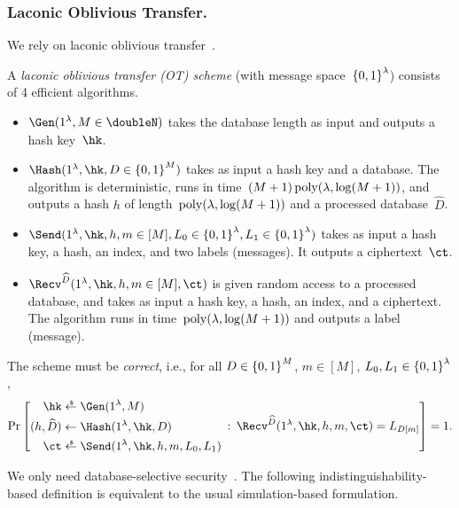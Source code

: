 \subsubsection{Laconic Oblivious Transfer.}
We rely on laconic oblivious transfer~\cite{C:CDGGMP17}.

\begin{definition}\label{def:lot}
A \emph{laconic oblivious transfer (OT) scheme} (with message space~${\{0,1\}}^\lambda$) consists of 4 efficient algorithms.
\begin{itemize}
\item $\Gen(1^\lambda,{M\in\doubleN})$ takes the database length as input and outputs a hash key~$\hk$.
\item $\Hash(1^\lambda,\hk,{D\in\bit^M})$ takes as input a hash key and a database.
The algorithm is deterministic,
runs in time~${(M+1)\operatorname{poly}(\lambda,\log(M+1))}$, and
outputs a hash $h$ of length~${\operatorname{poly}(\lambda,\log(M+1))}$ and a processed database~$\widehat{D}$.
\item $\Send(1^\lambda,\hk,h,{m\in[M]},{L_0\in\bit^\lambda},{L_1\in\bit^\lambda})$
takes as input a hash key, a hash, an index, and two labels (messages).
It outputs a ciphertext~$\ct$.
\item $\Recv^{\widehat{D}}(1^\lambda,\hk,h,{m\in[M]},\ct)$
is given random access to a processed database, and
takes as input a hash key, a hash, an index, and a ciphertext.
The algorithm runs in time~${\operatorname{poly}(\lambda,\log(M+1))}$ and outputs a label (message).
\end{itemize}
The scheme must be \emph{correct}, i.e., for all
${D\in{\{0,1\}}^M}$,
${m\in[M]}$,
${L_0,L_1\in{\{0,1\}}^\lambda}$,
\begin{align*}
\Pr\left[
\begin{aligned}
\hk&{}\draws\Gen(1^\lambda,M)\\
(h,\widehat{D})&{}\gets\Hash(1^\lambda,\hk,D)\\
\ct&{}\draws\Send(1^\lambda,\hk,h,m,L_0,L_1)
\end{aligned}
\::\:
\Recv^{\widehat{D}}(1^\lambda,\hk,h,m,\ct)=L_{D[m]}
\right]=1.
\end{align*}
\end{definition}

\noindent
We only need database-selective security~\cite{TCC:AnaLom18}.
The following indistinguishability-based definition is equivalent to the usual simulation-based formulation.


